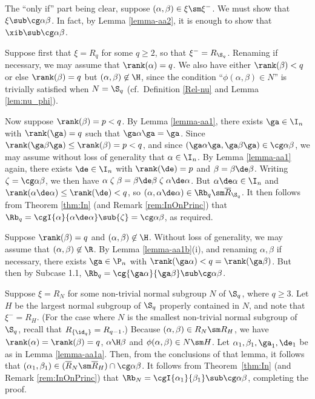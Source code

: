 \pf The ``only if'' part being clear, suppose $(\alpha,\beta)\in\xi\sm\xi^-$.  We must show that $\xi\sub\cg\alpha\beta$.  In fact, by Lemma \ref{lemma-aa2}, it is enough to show that $\xib\sub\cg\alpha\beta$.

\bigskip{}  Suppose first that $\xi=R_q$ for some $q\geq2$, so that $\xi^-=R_{\S_q}$.  Renaming if necessary, we may assume that $\rank(\alpha)=q$.  We also have either $\rank(\beta)<q$ or else $\rank(\beta)=q$ but $(\alpha,\beta)\not\in{\H}$, since the condition ``$\phi(\alpha,\beta)\in N$'' is trivially satisfied when $N=\S_q$ (cf.~Definition \ref{Rel-nu} and Lemma \ref{lem:nu_phi}).  

\bigskip{}  Now suppose $\rank(\beta)=p<q$.  By Lemma \ref{lemma-aa1}, there exists $\ga\in\I_n$ with $\rank(\ga)=q$ such that $\ga\alpha\ga=\ga$.  Since $\rank(\ga\beta\ga)\leq\rank(\beta)=p<q$, and since $(\ga\alpha\ga,\ga\beta\ga)\in\cg\alpha\beta$, we may assume without loss of generality that $\alpha\in\I_n$.  By Lemma \ref{lemma-aa1} again, there exists $\de\in\I_n$ with $\rank(\de)=p$ and $\beta=\beta\de\beta$.  Writing ${\zeta}=\cg\alpha\beta$, we then have
$\alpha \mathrel\zeta \beta = \beta\de\beta \mathrel\zeta \alpha\de\alpha$.
But $\alpha\de\alpha\in\I_n$ and $\rank(\alpha\de\alpha)\leq\rank(\de)<q$, so $(\alpha,\alpha\de\alpha)\in\Rb_q\sm\overline{R}_{\S_q}$.  It then follows from Theorem \ref{thm:In} (and Remark \ref{rem:InOnPrinc}) that $\Rb_q=\cgI{\alpha}{\alpha\de\alpha}\sub{\zeta}=\cg\alpha\beta$, as required.

\bigskip{}  Suppose $\rank(\beta)=q$ and $(\alpha,\beta)\not\in{\H}$.  Without loss of generality, we may assume that $(\alpha,\beta)\not\in{\R}$.  By Lemma \ref{lemma-aa1b}(i), and renaming $\alpha,\beta$ if necessary, there exists $\ga\in\P_n$ with $\rank(\ga\alpha)<q=\rank(\ga\beta)$.  But then by Subcase 1.1, $\Rb_q=\cg{\ga\alpha}{\ga\beta}\sub\cg\alpha\beta$.

\bigskip{}  Suppose $\xi=R_N$ for some non-trivial normal subgroup $N$ of $\S_q$, where $q\geq3$.  Let $H$ be the largest normal subgroup of $\S_q$ properly contained in $N$, and note that $\xi^-=R_H$.  (For the case where $N$ is the smallest non-trivial normal subgroup of $\S_q$, recall that $R_{\{\id_q\}}=R_{q-1}$.)  Because $(\alpha,\beta)\in R_N\sm R_H$, we have $\rank(\alpha)=\rank(\beta)=q$, $\alpha\H\beta$ and $\phi(\alpha,\beta)\in N\sm H$.  Let $\alpha_1,\beta_1,\ga_1,\de_1$ be as in Lemma \ref{lemma-aa1a}.  Then, from the conclusions of that lemma, it follows that $(\alpha_1,\beta_1)\in(\overline{R}_N\sm\overline{R}_H)\cap\cg\alpha\beta$.  It follows from Theorem~\ref{thm:In} (and Remark \ref{rem:InOnPrinc}) that $\Rb_N=\cgI{\alpha_1}{\beta_1}\sub\cg\alpha\beta$, completing the proof. \epf



